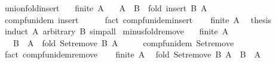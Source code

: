 \begin{isabellebody}
\endisatagproof
{\isafoldproof}%
%
\isadelimproof
\isanewline
%
\endisadelimproof
\isanewline
{}\isamarkupfalse%
\ union{\isacharunderscore}{\kern0pt}fold{\isacharunderscore}{\kern0pt}insert{\isacharcolon}{\kern0pt}\isanewline
\ \ \ {\isachardoublequoteopen}finite\ A{\isachardoublequoteclose}\isanewline
\ \ \ {\isachardoublequoteopen}A\ {\isasymunion}\ B\ {\isacharequal}{\kern0pt}\ fold\ insert\ B\ A{\isachardoublequoteclose}\isanewline
%
\isadelimproof
%
\endisadelimproof
%
\isatagproof
{}\isamarkupfalse%
\ {\isacharminus}{\kern0pt}\isanewline
\ \ \isamarkupfalse%
\ comp{\isacharunderscore}{\kern0pt}fun{\isacharunderscore}{\kern0pt}idem\ insert\isanewline
\ \ \ \ \isamarkupfalse%
\ {\isacharparenleft}{\kern0pt}fact\ comp{\isacharunderscore}{\kern0pt}fun{\isacharunderscore}{\kern0pt}idem{\isacharunderscore}{\kern0pt}insert{\isacharparenright}{\kern0pt}\isanewline
\ \ \isamarkupfalse%
\ {\isacartoucheopen}finite\ A{\isacartoucheclose}\ \isamarkupfalse%
\ {\isacharquery}{\kern0pt}thesis\isanewline
\ \ \ \ \isamarkupfalse%
\ {\isacharparenleft}{\kern0pt}induct\ A\ arbitrary{\isacharcolon}{\kern0pt}\ B{\isacharparenright}{\kern0pt}\ simp{\isacharunderscore}{\kern0pt}all\isanewline
{}\isamarkupfalse%
%
\endisatagproof
{\isafoldproof}%
%
\isadelimproof
\isanewline
%
\endisadelimproof
\isanewline
{}\isamarkupfalse%
\ minus{\isacharunderscore}{\kern0pt}fold{\isacharunderscore}{\kern0pt}remove{\isacharcolon}{\kern0pt}\isanewline
\ \ \ {\isachardoublequoteopen}finite\ A{\isachardoublequoteclose}\isanewline
\ \ \ {\isachardoublequoteopen}B\ {\isacharminus}{\kern0pt}\ A\ {\isacharequal}{\kern0pt}\ fold\ Set{\isachardot}{\kern0pt}remove\ B\ A{\isachardoublequoteclose}\isanewline
%
\isadelimproof
%
\endisadelimproof
%
\isatagproof
{}\isamarkupfalse%
\ {\isacharminus}{\kern0pt}\isanewline
\ \ \isamarkupfalse%
\ comp{\isacharunderscore}{\kern0pt}fun{\isacharunderscore}{\kern0pt}idem\ Set{\isachardot}{\kern0pt}remove\isanewline
\ \ \ \ \isamarkupfalse%
\ {\isacharparenleft}{\kern0pt}fact\ comp{\isacharunderscore}{\kern0pt}fun{\isacharunderscore}{\kern0pt}idem{\isacharunderscore}{\kern0pt}remove{\isacharparenright}{\kern0pt}\isanewline
\ \ \isamarkupfalse%
\ {\isacartoucheopen}finite\ A{\isacartoucheclose}\ \isamarkupfalse%
\ {\isachardoublequoteopen}fold\ Set{\isachardot}{\kern0pt}remove\ B\ A\ {\isacharequal}{\kern0pt}\ B\ {\isacharminus}{\kern0pt}\ A{\isachardoublequoteclose}\isanewline

\end{isabellebody}
